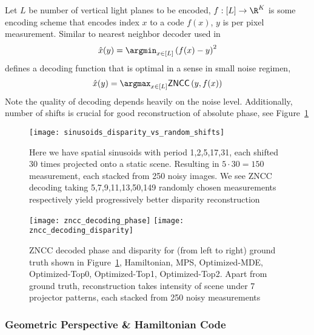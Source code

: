 \documentclass[../writeup.tex]{subfiles}
\begin{document}
Let $L$ be number of vertical light planes to be encoded, $f:[L]\to\R^K$ is some encoding scheme that encodes index $x$ to a code $f(x)$, $y$ is per pixel measurement. Similar to nearest neighbor decoder used in \cite{hornOptimalStructuredLight1997}
\begin{align}
    \hat{x}(y)
        = \argmin_{x\in [L]} \left( f(x) - y \right)^2
    \label{eq:nearest_neighbor_decoder}
\end{align}
\cite{mirdehghanOptimalStructuredLight2018} defines a decoding function that is optimal in a sense in small noise regimen,
\begin{align}
    \hat{x}(y)
        = \argmax_{x\in[L]} \textsf{ZNCC}\left( y, f(x) \right)
    \label{eq:zncc_decoder}
\end{align}
Note the quality of decoding depends heavily on the noise level. Additionally, number of shifts is crucial for good reconstruction of absolute phase, see Figure~\ref{fig:sinusoids_disparity_vs_random_shifts}
\begin{figure}[h!]
    \begin{center}
        \texttt{[image: sinusoids\_disparity\_vs\_random\_shifts]}
    \end{center}
    \caption{Here we have spatial sinusoids with period 1,2,5,17,31, each shifted 30 times projected onto a static scene. Resulting in $5\cdot 30=150$ measurement, each stacked from 250 noisy images. We see ZNCC decoding taking 5,7,9,11,13,50,149 randomly chosen measurements respectively yield progressively better disparity reconstruction}
    \label{fig:sinusoids_disparity_vs_random_shifts}
\end{figure} 
\begin{figure}[h!]
    \begin{center}
        \texttt{[image: zncc\_decoding\_phase]}
        \texttt{[image: zncc\_decoding\_disparity]}
    \end{center}
    \caption{ZNCC decoded phase and disparity for (from left to right) ground truth shown in Figure~\ref{fig:sinusoids_disparity_vs_random_shifts}, Hamiltonian, MPS, Optimized-MDE, Optimized-Top0, Optimized-Top1, Optimized-Top2. Apart from ground truth, reconstruction takes intensity of scene under 7 projector patterns, each stacked from 250 noisy measurements}
    \label{fig:zncc_decoding_phase_disparity}
\end{figure}  

\subsubsection{Geometric Perspective \& Hamiltonian Code} 
 
\end{document}
